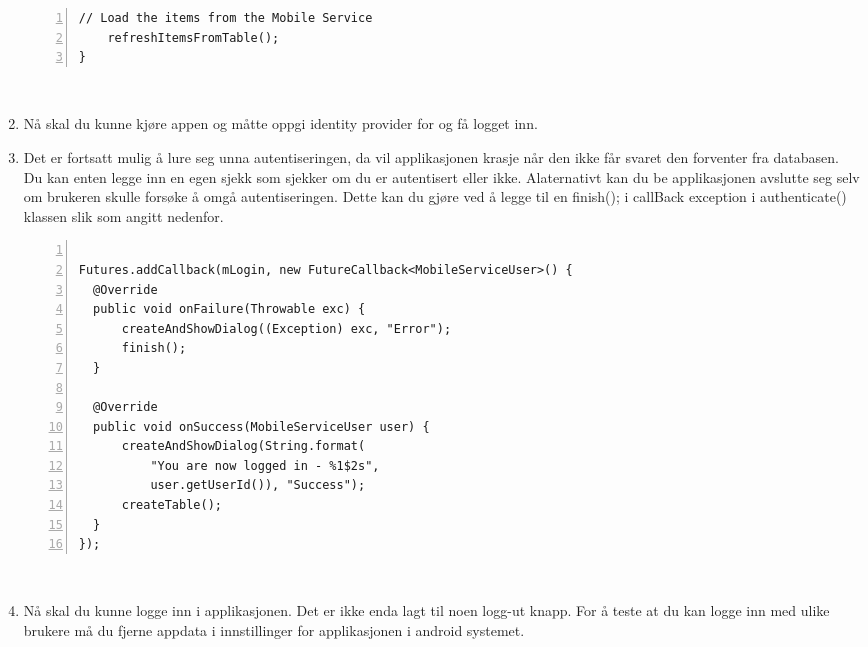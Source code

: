 \begin{enumerate}
\begin{lstlisting}[numbers=left, captionpos=b,   caption={Eksempel som viser hvordan createTable() klassen kan se ut.}, ]
    // Load the items from the Mobile Service
    refreshItemsFromTable();
}
\end{lstlisting}
\\
\item Nå skal du kunne kjøre appen og måtte oppgi identity provider for og få logget inn. \\
\item Det er fortsatt mulig å lure seg unna autentiseringen, da vil applikasjonen krasje når den ikke får svaret den forventer fra databasen. Du kan enten legge inn en egen sjekk som sjekker om du er autentisert eller ikke. Alaternativt kan du be applikasjonen avslutte seg selv om brukeren skulle forsøke å omgå autentiseringen. Dette kan du gjøre ved å legge til en finish(); i callBack exception i authenticate() klassen slik som angitt nedenfor.
\\
\begin{lstlisting}[numbers=left, captionpos=b,   caption={Eksempel som viser hvordan onFailure() kan se ut om det legges til en finish(); .},]

Futures.addCallback(mLogin, new FutureCallback<MobileServiceUser>() {
  @Override
  public void onFailure(Throwable exc) {
      createAndShowDialog((Exception) exc, "Error");
      finish();
  }

  @Override
  public void onSuccess(MobileServiceUser user) {
      createAndShowDialog(String.format(
          "You are now logged in - %1$2s",
          user.getUserId()), "Success");
      createTable();
  }
});

\end{lstlisting}
\\
\item Nå skal du kunne logge inn i applikasjonen. Det er ikke enda lagt til noen logg-ut knapp. For å teste at du kan logge inn med ulike brukere må du fjerne appdata i innstillinger for applikasjonen i android systemet. 
\end{enumerate}

